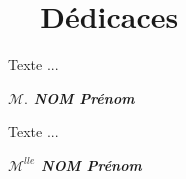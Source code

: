 \chapter*{\hrulefill ~~\textbf{Dédicaces}~ \hrulefill}
\vspace{2.3cm}

\begin{center}
Texte ...
\end{center}

\vspace{0.5cm}

\begin{flushright}
{\bf \it $\mathcal{M.}$ NOM Prénom}
\end{flushright}

\vspace{0.8cm}

\begin{center}
Texte ...
\end{center}

\vspace{0.5cm}

\begin{flushright}
{\bf \it $\mathcal{M}^{lle}$ NOM Prénom}
\end{flushright}

\vspace{0.8cm}


\thispagestyle{empty}
